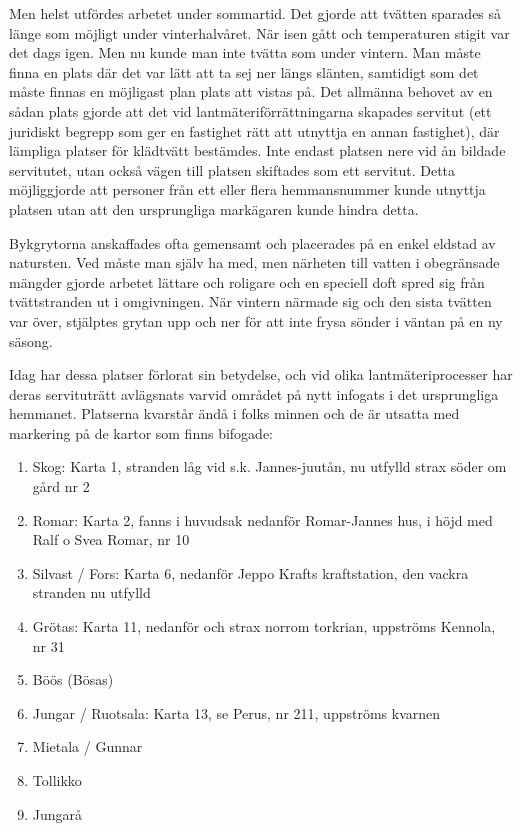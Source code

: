 Men helst utfördes arbetet under sommartid. Det gjorde att tvätten sparades så länge som möjligt under vinterhalvåret. När isen gått och temperaturen stigit var det dags igen. Men nu kunde man inte tvätta som under vintern. Man måste finna en plats där det var lätt att ta sej ner längs slänten, samtidigt som det måste finnas en möjligast plan plats att vistas på. Det allmänna behovet av en sådan plats gjorde att det vid lantmäteriförrättningarna skapades servitut (ett juridiskt begrepp som ger en fastighet rätt att utnyttja en annan fastighet), där lämpliga platser för klädtvätt bestämdes. Inte endast platsen nere vid ån bildade servitutet, utan också vägen till platsen skiftades som ett servitut. Detta möjliggjorde att personer från ett eller flera hemmansnummer kunde utnyttja platsen utan att den ursprungliga markägaren kunde hindra detta.

Bykgrytorna anskaffades ofta gemensamt och placerades på en enkel eldstad av natursten. Ved måste man själv ha med, men närheten till vatten i obegränsade mängder gjorde arbetet lättare och roligare och en speciell doft spred sig från tvättstranden ut i omgivningen. När vintern närmade sig och den sista tvätten var över, stjälptes grytan upp och ner för att inte frysa sönder i väntan på en ny säsong.

Idag har dessa platser förlorat sin betydelse, och vid olika lantmäteriprocesser har deras servituträtt avlägsnats varvid området på nytt infogats i det ursprungliga hemmanet. Platserna kvarstår ändå i folks minnen och de är utsatta med  markering på de kartor som finns bifogade:

\begin{enumerate}
  \item Skog: Karta 1, stranden låg vid s.k. Jannes-juutån, nu utfylld strax söder om gård nr 2
  \item Romar: Karta 2, fanns i huvudsak nedanför Romar-Jannes hus, i höjd med Ralf o Svea Romar, nr 10
  \item Silvast / Fors: Karta 6, nedanför Jeppo Krafts kraftstation, den vackra stranden nu utfylld
  \item Grötas: Karta 11, nedanför och strax norrom torkrian, uppströms Kennola, nr 31
  \item Böös (Bösas)
  \item Jungar / Ruotsala: Karta 13, se Perus, nr 211, uppströms kvarnen
  \item Mietala / Gunnar
  \item Tollikko
  \item Jungarå
\end{enumerate}


